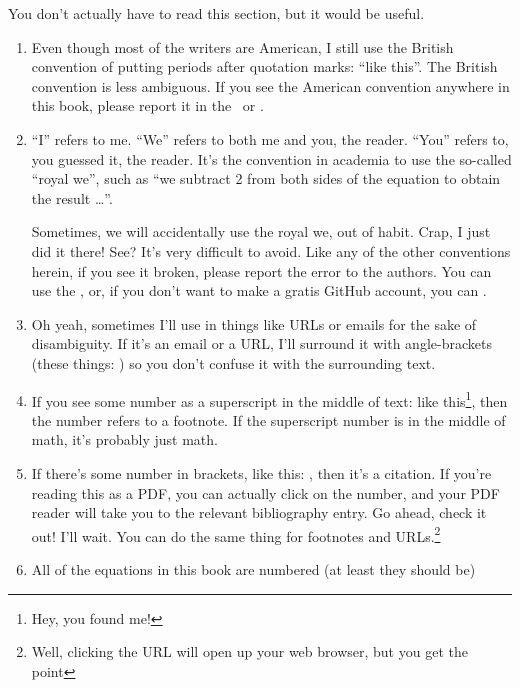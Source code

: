 
You don't actually have to read this section, but it would be useful.

\begin{enumerate}
  \item Even though most of the writers are American, I still use the British
    convention of putting periods after quotation marks: ``like this''. The
    British convention is less ambiguous. If you see the American convention
    anywhere in this book, please report it in the \bugtracker\ or \emailme .
  \item ``I'' refers to me. ``We'' refers to both me and you, the
    reader. ``You'' refers to, you guessed it, the reader. It's the convention
    in academia to use the so-called ``royal we'', such as ``we subtract 2 from
    both sides of the equation to obtain the result \dots''.

    Sometimes, we will accidentally use the royal we, out of habit. Crap, I just
    did it there! See? It's very difficult to avoid. Like any of the other
    conventions herein, if you see it broken, please report the error to the
    authors. You can use the \bugtracker , or, if you don't want to make a
    gratis GitHub account, you can \emailme .

  \item Oh yeah, sometimes I'll use  in things like URLs or
    emails for the sake of disambiguity. If it's an email or a URL, I'll
    surround it with angle-brackets (these things: \code{<>}) so you don't
    confuse it with the surrounding text.

  \item If you see some number as a superscript in the middle of text: like
    this\footnote{Hey, you found me!}, then the number refers to a footnote. If
    the superscript number is in the middle of math, it's probably just math.

  \item If there's some number in brackets, like this: \cite{lyah}, then it's a
    citation. If you're reading this as a PDF, you can actually click on the
    number, and your PDF reader will take you to the relevant bibliography
    entry. Go ahead, check it out! I'll wait. You can do the same thing for
    footnotes and URLs.\footnote{Well, clicking the URL will open up your web
      browser, but you get the point}

  \item All of the equations in this book are numbered (at least they should be)


\end{enumerate}
